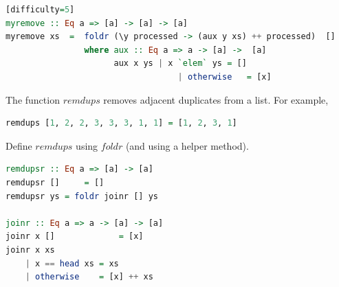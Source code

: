 \documentclass{article}
\begin{document}
\begin{solution}
\begin{lstlisting}[language=Haskell][difficulty=5]
myremove :: Eq a => [a] -> [a] -> [a]
myremove xs  =  foldr (\y processed -> (aux y xs) ++ processed)  [] 
                where aux :: Eq a => a -> [a] ->  [a]
                      aux x ys | x `elem` ys = []
                                   | otherwise   = [x]
\end{lstlisting}
\end{solution}


\begin{exercise} 
The function $remdups$ removes adjacent duplicates from a list. For example,
\begin{lstlisting}[language=Haskell]
remdups [1, 2, 2, 3, 3, 3, 1, 1] = [1, 2, 3, 1]
\end{lstlisting}

Define $remdups$ using $foldr$ (and using a helper method). 
\end{exercise} 

\begin{solution}
\begin{lstlisting}[language=Haskell]
remdupsr :: Eq a => [a] -> [a]
remdupsr []     = []
remdupsr ys = foldr joinr [] ys
        
joinr :: Eq a => a -> [a] -> [a]
joinr x []             = [x]
joinr x xs
    | x == head xs = xs
    | otherwise    = [x] ++ xs        
\end{lstlisting}
\end{solution}
%
\end{document}
